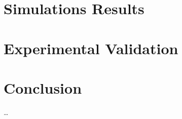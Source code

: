 \documentclass{ifacconf}
\begin{document}
\section{Simulations Results}
\label{sec:simulation_results}

\section{Experimental Validation}
\label{sec:experimental_validation}

\section{Conclusion}
\label{sec:conclusion}

\dots

\end{document}
